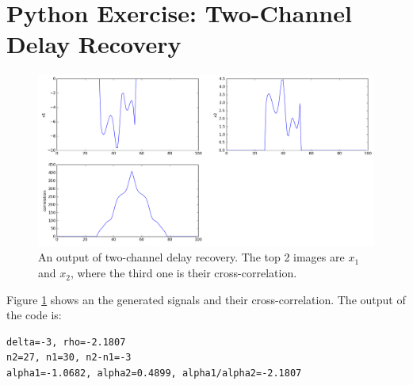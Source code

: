 \section{Python Exercise: Two-Channel Delay Recovery}\label{sec:p8}

\begin{figure}[htbp]
	\centering
	\includegraphics[width=\textwidth]{images/p8-1}
	\caption{An output of two-channel delay recovery. The top 2 images are $x_1$ and $x_2$, where the third one is their cross-correlation.}
	\label{fig:p8-1}
\end{figure}

Figure \ref{fig:p8-1} shows an the generated signals and their cross-correlation. The output of the code is:

\begin{lstlisting}
delta=-3, rho=-2.1807
n2=27, n1=30, n2-n1=-3
alpha1=-1.0682, alpha2=0.4899, alpha1/alpha2=-2.1807
\end{lstlisting}